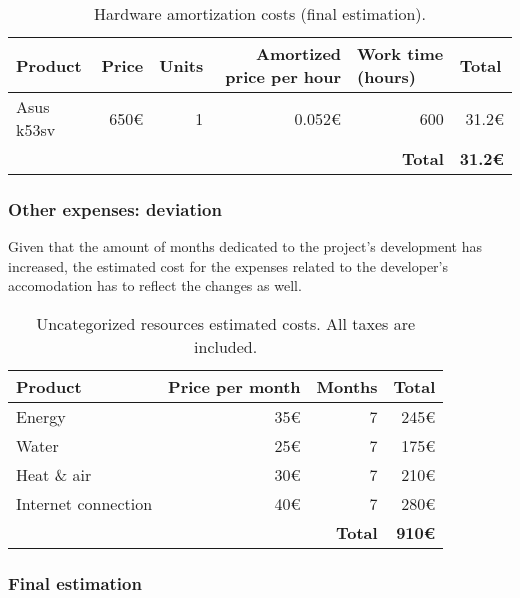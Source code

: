 \begin{table}[h]
	\centering
	\begin{tabular}{l r r r r r}
		\hline
		\textbf{Product} & \multicolumn{1}{l}{\textbf{Price}} & \multicolumn{1}{l}{\textbf{Units}} & \multicolumn{1}{p{3cm}}{\textbf{Amortized price per hour}} & \multicolumn{1}{l}{\textbf{Work time (hours)}} & \multicolumn{1}{l}{\textbf{Total}} \\ \hline
		Asus k53sv & 650€ & 1 & 0.052€ & 600 & 31.2€ \\ \hline
		&  &  &  & \textbf{Total} & \textbf{31.2€}
	\end{tabular}
	\caption[Final estimation: hardware resources costs.]{Hardware amortization costs (final estimation).}
	\label{table:hardware-resources-final}
\end{table}

\subsubsection*{Other expenses: deviation}

Given that the amount of months dedicated to the project's development has increased, the estimated cost for the expenses related to the developer's accomodation has to reflect the changes as well.

\begin{table}[h]
	\centering
	\begin{tabular}{lrrr}
		\hline
		\textbf{Product} & \multicolumn{1}{l}{\textbf{Price per month}} & \multicolumn{1}{l}{\textbf{Months}} & \multicolumn{1}{l}{\textbf{Total}} \\ \hline
		Energy & 35€ & 7 & 245€ \\
		Water & 25€ & 7 & 175€ \\
		Heat \& air & 30€ & 7 & 210€ \\
		Internet connection & 40€ & 7 & 280€ \\ \hline
		& \multicolumn{1}{l}{} & \textbf{Total} & \textbf{910€}
	\end{tabular}
	\caption[Final estimation: uncategorized resources costs.]{Uncategorized resources estimated costs. All taxes are included.}
	\label{table:other-resources-final}
\end{table}

\clearpage

\subsubsection*{Final estimation}


